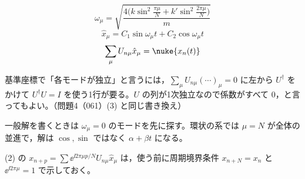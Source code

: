 \[
  \omega_{\mu}=\sqrt{\frac{4\bigl(k\sin^{2}\frac{\pi\mu}{N}+k'\sin^{2}\frac{2\pi\mu}{N}\bigr)}{m}}
\]
\[
  \hat{x}_{\mu}=C_1\sin\omega_{\mu}t+C_2\cos\omega_{\mu}t
\]
\[
  \sum_{\mu}U_{n\mu}\hat{x}_{\mu}=\nuke{x_n(t)}
\]
\mikai
{}
\mikai
\item 基準座標で「各モードが独立」と言うには，$\sum_{\mu}U_{n\mu}(\cdots)_{\mu}=0$ に左から $U^{\dagger}$ をかけて $U^{\dagger}U=I$ を使う1行が要る。$U$ の列が1次独立なので係数がすべて 0，と言ってもよい。（問題4（061）(3) と同じ書き換え）
\item 一般解を書くときは $\omega_{\mu}=0$ のモードを先に探す。環状の系では $\mu=N$ が全体の並進で，解は $\cos,\sin$ ではなく $\alpha+\beta t$ になる。
\item (2) の $x_{n+p}=\sum\ee^{\ii2\pi\mu p/N}U_{n\mu}\hat{x}_{\mu}$ は，使う前に周期境界条件 $x_{n+N}=x_n$ と $\ee^{\ii2\pi\mu}=1$ で示しておく。
